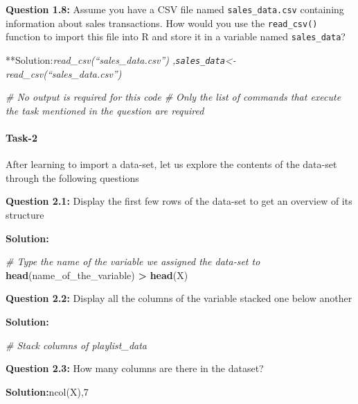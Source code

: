 \documentclass[
]{article}
\newenvironment{Shaded}{\begin{snugshade}}{\end{snugshade}}
\newcommand{\CommentTok}[1]{\textcolor[rgb]{0.56,0.35,0.01}{\textit{#1}}}
\newcommand{\FunctionTok}[1]{\textcolor[rgb]{0.13,0.29,0.53}{\textbf{#1}}}
\newcommand{\NormalTok}[1]{#1}
\newcommand{\SpecialCharTok}[1]{\textcolor[rgb]{0.81,0.36,0.00}{\textbf{#1}}}
\begin{document}
\textbf{Question 1.8:} Assume you have a CSV file named
\texttt{sales\_data.csv} containing information about sales
transactions. How would you use the \texttt{read\_csv()} function to
import this file into R and store it in a variable named
\texttt{sales\_data}?

**Solution:\emph{read\_csv(``sales\_data.csv'')
,\texttt{sales\_data}\textless- read\_csv(``sales\_data.csv'') }

\begin{Shaded}
\begin{Highlighting}[]
\CommentTok{\# No output is required for this code}
\CommentTok{\# Only the list of commands that execute the task mentioned in the question are required}
\end{Highlighting}
\end{Shaded}

\hypertarget{task-2}{%
\paragraph{Task-2}\label{task-2}}

After learning to import a data-set, let us explore the contents of the
data-set through the following questions

\textbf{Question 2.1:} Display the first few rows of the data-set to get
an overview of its structure

\textbf{Solution:}

\begin{Shaded}
\begin{Highlighting}[]
\CommentTok{\# Type the name of the variable we assigned the data{-}set to}
\FunctionTok{head}\NormalTok{(name\_of\_the\_variable)}
\SpecialCharTok{\textgreater{}} \FunctionTok{head}\NormalTok{(X)}
\end{Highlighting}
\end{Shaded}

\textbf{Question 2.2:} Display all the columns of the variable stacked
one below another

\textbf{Solution:}

\begin{Shaded}
\begin{Highlighting}[]
\CommentTok{\# Stack columns of playlist\_data}
\end{Highlighting}
\end{Shaded}

\textbf{Question 2.3:} How many columns are there in the dataset?

\textbf{Solution:}ncol(X),7
\end{document}
